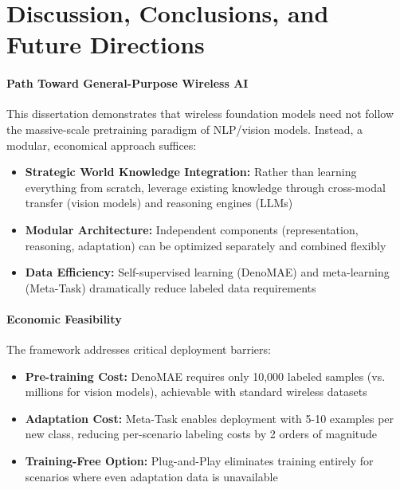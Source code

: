 %
%

\chapter{Discussion, Conclusions, and Future Directions}
\label{chap:discussion_conclusion}



\subsubsection{Path Toward General-Purpose Wireless AI}

This dissertation demonstrates that wireless foundation models need not follow the massive-scale pretraining paradigm of NLP/vision models. Instead, a modular, economical approach suffices:

\begin{itemize}
    \item \textbf{Strategic World Knowledge Integration:} Rather than learning everything from scratch, leverage existing knowledge through cross-modal transfer (vision models) and reasoning engines (LLMs)
    \item \textbf{Modular Architecture:} Independent components (representation, reasoning, adaptation) can be optimized separately and combined flexibly
    \item \textbf{Data Efficiency:} Self-supervised learning (DenoMAE) and meta-learning (Meta-Task) dramatically reduce labeled data requirements
\end{itemize}

\subsubsection{Economic Feasibility}

The framework addresses critical deployment barriers:

\begin{itemize}
    \item \textbf{Pre-training Cost:} DenoMAE requires only 10,000 labeled samples (vs. millions for vision models), achievable with standard wireless datasets
    \item \textbf{Adaptation Cost:} Meta-Task enables deployment with 5-10 examples per new class, reducing per-scenario labeling costs by 2 orders of magnitude
    \item \textbf{Training-Free Option:} Plug-and-Play eliminates training entirely for scenarios where even adaptation data is unavailable
\end{itemize}

